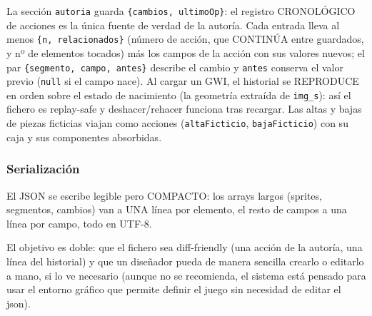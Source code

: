 La sección \texttt{autoria} guarda \texttt{\{cambios, ultimoOp\}}: el
registro CRONOLÓGICO de acciones es la única fuente de verdad de la
autoría. Cada entrada lleva al menos \texttt{\{n, relacionados\}} (número de
acción, que CONTINÚA entre guardados, y nº de elementos tocados) más los
campos de la acción con sus valores nuevos; el par
\texttt{\{segmento, campo, antes\}} describe el cambio y \texttt{antes}
conserva el valor previo (\texttt{null} si el campo nace). Al cargar un GWI,
el historial se REPRODUCE en orden sobre el estado de nacimiento (la
geometría extraída de \texttt{img\_s}): así el fichero es replay-safe y
deshacer/rehacer funciona tras recargar. Las altas y bajas de piezas
ficticias viajan como acciones (\texttt{altaFicticio}, \texttt{bajaFicticio})
con su caja y sus componentes absorbidas.

\subsubsection*{Serialización}
\label{sec:F1A01Serializacion}

El JSON se escribe legible pero COMPACTO: los arrays largos (sprites,
segmentos, cambios) van a UNA línea por elemento, el resto de campos a una
línea por campo, todo en UTF-8. 

El objetivo es doble: que el fichero sea
diff-friendly (una acción de la autoría, una línea del historial) y que un
diseñador pueda de manera sencilla crearlo o editarlo a mano, si lo ve 
necesario (aunque no se recomienda, el sistema está pensado para usar el 
entorno gráfico que permite definir el juego sin necesidad de editar el json).